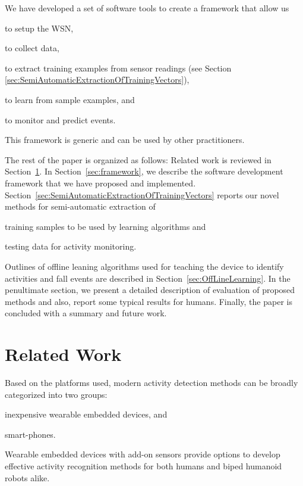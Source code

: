 \documentclass[]{IEEEtran}
\begin{document}
We have developed a set of software tools to create a framework that allow us
\begin{inparaenum}[($i$)] \item  to setup the WSN, \item to collect data, \item
to extract training examples from sensor readings (see Section
\ref{sec:SemiAutomaticExtractionOfTrainingVectors}), \item to learn from sample
examples, and \item to monitor and predict events. \end{inparaenum} This
framework is generic and can be used by other practitioners.

The rest of the paper is organized as follows: Related work is reviewed in
Section~\ref{subSec:relatedWork}. In Section~\ref{sec:framework}, we describe
the software development framework that we have proposed and implemented.
Section~\ref{sec:SemiAutomaticExtractionOfTrainingVectors} reports our novel
methods for  semi-automatic extraction  of \begin{inparaenum} [($i$)] \item
training samples to be used by  learning algorithms  and \item testing data for
activity monitoring.  \end{inparaenum} Outlines of offline leaning algorithms
used for teaching the device to identify activities and fall events are
described in Section~\ref{sec:OffLineLearning}.  In the penultimate section, we
present a detailed description of evaluation of proposed methods and also,
report some typical results for humans. Finally, the paper is concluded with a
summary and future work.  

\section{Related Work}
\label{subSec:relatedWork}

Based on the platforms used, modern activity detection methods can be broadly
categorized into two groups: \begin{inparaenum}[($i$)] \item inexpensive
wearable embedded devices, and \item smart-phones.  \end{inparaenum} Wearable
embedded devices with add-on sensors provide options to develop effective
activity recognition methods for both humans and biped humanoid robots alike. 
\end{document}

